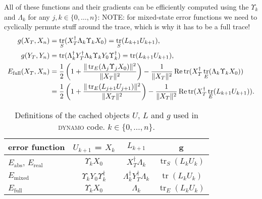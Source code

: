 \documentclass[aps, pra, a4paper, longbibliography, superscriptaddress]{revtex4-1}
\DeclareMathOperator{\tr}{tr}
\DeclareMathOperator{\re}{Re}
\newcommand{\spr}{\Upsilon}
\newcommand{\Xt}{X_T}  %
\newcommand{\Xo}{X_0}  %
\newcommand{\Xn}{X_n}  %
\newcommand{\DYNAMO}{\textsc{dynamo}}
\begin{document}
All of these functions and their gradients can be efficiently computed
using the $\spr_k$ and $\Lambda_k$
for any $j, k \in \{0, \ldots, n\}$:
NOTE: for mixed-state error functions we need to cyclically permute stuff around the trace, which is why it has to be a full trace!
\begin{align}
g(\Xt, \Xn) &= \tr_S(\Xt^\dagger \Lambda_k \spr_k \Xo)
= \tr_S(L_{k+1} U_{k+1}),\\
g(Y_T, Y_n) &= \tr(\Lambda_k^\dagger Y_T^\dagger \Lambda_k \spr_k Y_0 \spr_k^\dagger)
= \tr(L_{k+1} U_{k+1}),\\
\notag
E_\text{full}(\Xt, \Xn) &= \frac{1}{2}\left(1 +\frac{\|\tr_E(\Lambda_j \spr_j \Xo)\|^2}{\|\Xt\|^2}\right)
-\frac{1}{\|\Xt\|^2} \re \tr(\Xt^\dagger \tr_E(\Lambda_k \spr_k \Xo))\\
&= \frac{1}{2}\left(1 +\frac{\|\tr_E(L_{j+1} U_{j+1})\|^2}{\|\Xt\|^2}\right)
-\frac{1}{\|\Xt\|^2} \re \tr(\Xt^\dagger \tr_E(L_{k+1} U_{k+1})).
\end{align}

\begin{table}
\begin{tabular}{l|c|c|c}
error function & $U_{k+1}$ = $X_k$ & $L_{k+1}$ & g\\
\hline
$E_\text{abs}$, $E_\text{real}$ & $\spr_k \Xo$ & $\Xt^\dagger \Lambda_k$ & $\tr_S(L_k U_k)$\\
$E_\text{mixed}$ & $\spr_k Y_0 \spr_k^\dagger$ & $\Lambda_k^\dagger Y_T^\dagger \Lambda_k$ & $\tr(L_k U_k)$\\
$E_\text{full}$ & $\spr_k \Xo$ & $\Lambda_k$ & $\tr_E(L_k U_k)$
\end{tabular}
\caption{Definitions of the cached objects $U$, $L$ and $g$ used in \DYNAMO{}
  code. $k \in \{0, \ldots, n\}$.}
\label{table:UL}
\end{table}
\end{document}
